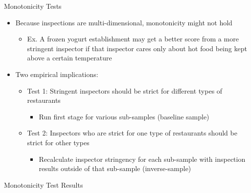 \documentclass[handout]{beamer}
\begin{document}
\begin{frame}{Monotonicity Tests}
\begin{itemize}
\item Because inspections are multi-dimensional, monotonicity might not hold
\begin{itemize}
\item Ex. A frozen yogurt establishment may get a better score from a more stringent inspector if that inspector cares only about hot food being kept above a certain temperature
\end{itemize}
\item Two empirical implications:
\begin{itemize}
\item Test 1: Stringent inspectors should be strict for different types of restaurants 
\begin{itemize}
\item Run first stage for various sub-samples (baseline sample)
\end{itemize}
\item Test 2: Inspectors who are strict for one type of restaurants should be strict for other types
\begin{itemize}
\item Recalculate inspector stringency for each sub-sample with inspection results outside of that sub-sample (inverse-sample)
\end{itemize}
\end{itemize}
\end{itemize}
\end{frame}
\begin{frame}{Monotonicity Test Results}
\begin{table}[h!]
\scalebox{0.45}{  }

\scalebox{0.45}{  }

\scalebox{0.45}{   }

\scalebox{0.45}{   }
\end{table}
\end{frame}
\end{document}
